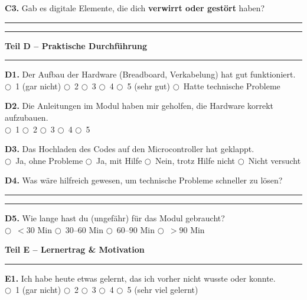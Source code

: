 \documentclass[a4paper,10pt]{article}
\newcommand{\radio}{\textsf{\Large$\bigcirc$}}
\newcommand{\linefill}{\rule{\linewidth}{0.4pt}\vspace{1.2ex}}
\begin{document}
\vspace{4pt}
\textbf{C3.} Gab es digitale Elemente, die dich \textbf{verwirrt oder gestört} haben?\\
\linefill
\linefill

\vspace{8pt}

{\large \bfseries \color{primary} Teil D – Praktische Durchführung}\\[-4pt]
\color{accent}\rule{\linewidth}{1.5pt}\color{black}\vspace{4pt}

\textbf{D1.} Der Aufbau der Hardware (Breadboard, Verkabelung) hat gut funktioniert.\\
\radio~1 (gar nicht) \quad \radio~2 \quad \radio~3 \quad \radio~4 \quad \radio~5 (sehr gut) \quad \radio~Hatte technische Probleme

\vspace{5pt}
\textbf{D2.} Die Anleitungen im Modul haben mir geholfen, die Hardware korrekt aufzubauen.\\
\radio~1 \quad \radio~2 \quad \radio~3 \quad \radio~4 \quad \radio~5

\vspace{5pt}
\textbf{D3.} Das Hochladen des Codes auf den Microcontroller hat geklappt.\\
\radio~Ja, ohne Probleme \quad \radio~Ja, mit Hilfe \quad \radio~Nein, trotz Hilfe nicht \quad \radio~Nicht versucht

\vspace{5pt}
\textbf{D4.} Was wäre hilfreich gewesen, um technische Probleme schneller zu lösen?\\
\linefill
\linefill

\vspace{5pt}
\textbf{D5.} Wie lange hast du (ungefähr) für das Modul gebraucht?\\
\radio~$< 30$ Min \quad \radio~$30$--$60$ Min \quad \radio~$60$--$90$ Min \quad \radio~$> 90$ Min

\vspace{8pt}

{\large \bfseries \color{primary} Teil E – Lernertrag \& Motivation}\\[-4pt]
\color{accent}\rule{\linewidth}{1.5pt}\color{black}\vspace{4pt}

\textbf{E1.} Ich habe heute etwas gelernt, das ich vorher nicht wusste oder konnte.\\
\radio~1 (gar nicht) \quad \radio~2 \quad \radio~3 \quad \radio~4 \quad \radio~5 (sehr viel gelernt)
\end{document}
